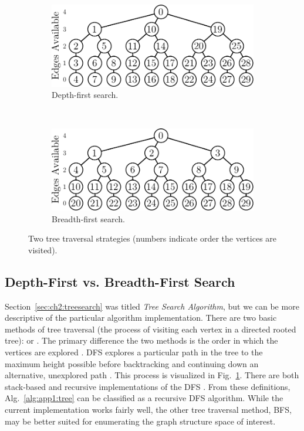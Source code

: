 \begin{figure}[h!]
\centering
\begin{subfigure}[b]{0.48\textwidth}
    \centering
    \includegraphics[width=\textwidth]{../app1/fig/dfs}
    \caption{Depth-first search.\label{fig:app1:dfs}}
\end{subfigure}~
\begin{subfigure}[b]{0.48\textwidth}
    \centering
    \includegraphics[width=\textwidth]{../app1/fig/bfs}
    \caption{Breadth-first search.\label{fig:app1:bfs}}
\end{subfigure}
\caption[Two tree traversal strategies.]{Two tree traversal strategies (numbers indicate order the vertices are visited).\label{fig:app1:search}}
\end{figure}

\subsection{Depth-First vs. Breadth-First Search}

Section~\ref{sec:ch2:treesearch} was titled \textit{Tree Search Algorithm}, but we can be more descriptive of the particular algorithm implementation.
There are two basic methods of tree traversal (the process of visiting each vertex in a directed rooted tree):  or  \cite{Skiena2008a, Cormen2009a}.
The primary difference the two methods is the order in which the vertices are explored \cite{Skiena2008a}. 
DFS explores a particular path in the tree to the maximum height possible before backtracking and continuing down an alternative, unexplored path \cite{Cormen2009a}.
This process is visualized in Fig.~\ref{fig:app1:dfs}.
There are both stack-based and recursive implementations of the DFS \cite[pp.~169--172]{Skiena2008a}.
From these definitions, Alg.~\ref{alg:app1:tree} can be classified as a recursive DFS algorithm.
While the current implementation works fairly well, the other tree traversal method, BFS, may be better suited for enumerating the graph structure space of interest.

